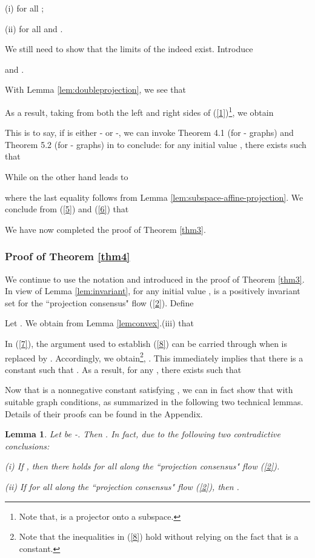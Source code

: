 \documentclass[a4paper, 11pt]{article}
\newtheorem{lemma}{Lemma}
\begin{document}
(i)  for all ;

(ii)   for all  and .

 We still need to show that the limits of the  indeed exist. Introduce

and .

 With Lemma \ref{lem:doubleprojection},  we see that
 
 As a result, taking  from both the left and right sides of (\ref{1})\footnote{Note that,  is a projector onto a subspace.}, we obtain

This is to say, if  is either  - or -, we can invoke Theorem 4.1 (for - graphs) and Theorem 5.2 (for - graphs) in \cite{shisiam} to conclude:  for any initial value , there exists  such that

While on the other hand  leads to

where the last equality follows from Lemma \ref{lem:subspace-affine-projection}. We conclude from (\ref{5}) and (\ref{6}) that

We have now completed the proof of Theorem \ref{thm3}.
\subsubsection{Proof of Theorem \ref{thm4}}
We continue to use the notation   
and  introduced in the proof of Theorem \ref{thm3}. In view of Lemma \ref{lem:invariant}, for any initial value ,
  is a positively invariant set for the ``projection consensus" flow (\ref{2}). Define


Let .  We obtain from Lemma \ref{lemconvex}.(iii) that

In (\ref{7}), the argument used to establish (\ref{8}) can be carried through when   is replaced by  . Accordingly, we obtain\footnote{Note that the inequalities in (\ref{8}) hold without relying   on the fact that  is a constant.}, . This immediately implies that   there is a  constant  such that . As a result, for any , there exists  such that



Now that  is a nonnegative constant satisfying  , we can in fact show that  with suitable graph conditions, as summarized in the following  two technical lemmas. Details of their proofs can be found  in the Appendix.


\medskip




\begin{lemma}\label{lem:directed}
Let   be -. Then . In fact,  due to the following two contradictive conclusions:

  (i) If , then  there holds    for all   along the ``projection consensus" flow (\ref{2}).

  (ii) If      for all   along the ``projection consensus" flow (\ref{2}), then .
\end{lemma}
\end{document}
